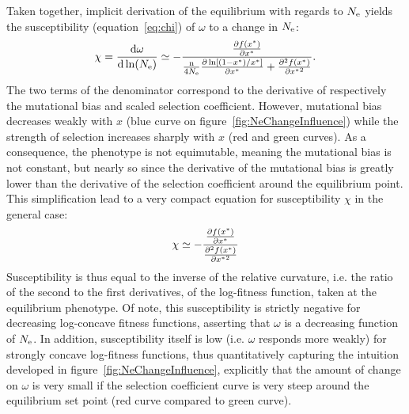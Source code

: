 Taken together, implicit derivation of the equilibrium with regards to $N_{\mathrm{e}}$ yields the susceptibility (equation~\ref{eq:chi}) of $\omega$ to a change in $N_{\mathrm{e}}$:
\begin{gather}
    \chi = \frac{ \mathrm{d} \omega}{\mathrm{d} \ln (N_{\mathrm{e}})} \simeq - \frac{\frac{ \partial f (x^{*}) }{\partial {x^{*}}}}{\frac{\text{n}}{4 N_{\mathrm{e}}} \frac{\partial \ln [ (1 - x^{*}) / x^{*} ]}{\partial x^{*} } + \frac{ \partial^2 f (x^{*}) }{\partial {x^{*}}^2}}.
\end{gather}
The two terms of the denominator correspond to the derivative of respectively the mutational bias and scaled selection coefficient.
However, mutational bias decreases weakly with $x$ (blue curve on figure~\ref{fig:NeChangeInfluence}) while the strength of selection increases sharply with $x$ (red and green curves).
As a consequence, the phenotype is not equimutable, meaning the mutational bias is not constant, but nearly so since the derivative of the mutational bias is greatly lower than the derivative of the selection coefficient around the equilibrium point.
This simplification lead to a very compact equation for susceptibility $\chi$ in the general case:
\begin{gather}
    \chi \simeq - \frac{\frac{ \partial f (x^{*}) }{\partial {x^{*}}}}{\frac{ \partial^2 f (x^{*}) }{\partial {x^{*}}^2}}
\end{gather}
Susceptibility is thus equal to the inverse of the relative curvature, i.e. the ratio of the second to the first derivatives, of the log-fitness function, taken at the equilibrium phenotype.
Of note, this susceptibility is strictly negative for decreasing log-concave fitness functions, asserting that $\omega$ is a decreasing function of $N_{\mathrm{e}}$.
In addition, susceptibility itself is low (i.e. $\omega$ responds more weakly) for strongly concave log-fitness functions, thus quantitatively capturing the intuition developed in figure~\ref{fig:NeChangeInfluence}, explicitly that the amount of change on $\omega$ is very small if the selection coefficient curve is very steep around the equilibrium set point (red curve compared to green curve).

